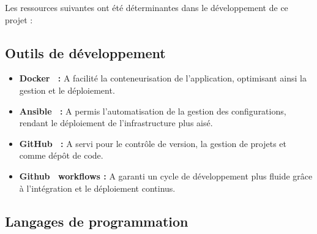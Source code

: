 Les ressources suivantes ont été déterminantes dans le développement de ce projet :

\subsection{Outils de développement}\label{subsec:outils-de-developpement}
\begin{itemize}
    \item \textbf{Docker~\cite{dockerDoc:online} :} A facilité la conteneurisation de l'application, optimisant ainsi la gestion et le déploiement.
    \item \textbf{Ansible~\cite{ansibleDoc:online} :} A permis l'automatisation de la gestion des configurations, rendant le déploiement de l'infrastructure plus aisé.
    \item \textbf{GitHub~\cite{craftbra55:online} :} A servi pour le contrôle de version, la gestion de projets et comme dépôt de code.
    \item \textbf{Github~\cite{Usingwor49:online} workflows :} A garanti un cycle de développement plus fluide grâce à l'intégration et le déploiement continus.
\end{itemize}

\subsection{Langages de programmation}\label{subsec:langages-de-programmation}

